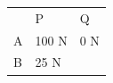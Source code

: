 \begin{enumerate}[noitemsep, label=\textbf{\arabic*}. ]
{{\begin{center}
\begin{xtabular}[t]{|l|l|l|}
    
         &
    
    
        P &
    
    
        Q%
     \tabularnewline{}
    
    
        A &
    
    
        100 N &
    
    
        0 N%
     \tabularnewline{}
    
    
        B &
    
    
        25 N &
    
    

\end{xtabular}
\end{center}}}
\end{enumerate}
